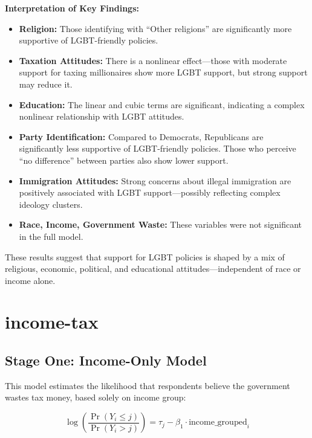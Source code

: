 \documentclass{article}
\begin{document}
\noindent
\textbf{Interpretation of Key Findings:}
\begin{itemize}
  \item \textbf{Religion:} Those identifying with ``Other religions'' are significantly more supportive of LGBT-friendly policies.
  
  \item \textbf{Taxation Attitudes:} There is a nonlinear effect—those with moderate support for taxing millionaires show more LGBT support, but strong support may reduce it.
  
  \item \textbf{Education:} The linear and cubic terms are significant, indicating a complex nonlinear relationship with LGBT attitudes.
  
  \item \textbf{Party Identification:} Compared to Democrats, Republicans are significantly less supportive of LGBT-friendly policies. Those who perceive ``no difference'' between parties also show lower support.
  
  \item \textbf{Immigration Attitudes:} Strong concerns about illegal immigration are positively associated with LGBT support—possibly reflecting complex ideology clusters.
  
  \item \textbf{Race, Income, Government Waste:} These variables were not significant in the full model.
\end{itemize}

\noindent
These results suggest that support for LGBT policies is shaped by a mix of religious, economic, political, and educational attitudes—independent of race or income alone.



\section{income-tax}

\subsection{Stage One: Income-Only Model}

This model estimates the likelihood that respondents believe the government wastes tax money, based solely on income group:

\[
\log \left( \frac{\Pr(Y_i \leq j)}{\Pr(Y_i > j)} \right) = \tau_j - \beta_1 \cdot \text{income\_grouped}_i
\]
\end{document}
